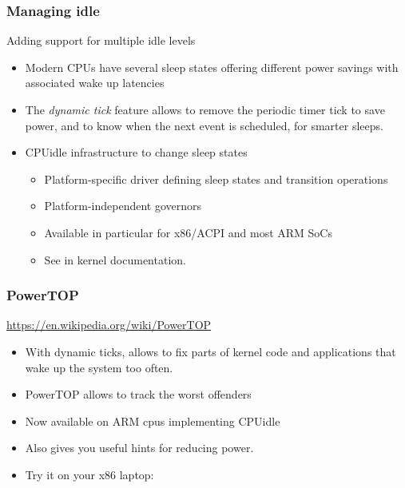 \begin{frame}
  \frametitle{Managing idle}
  Adding support for multiple idle levels
  \begin{itemize}
  \item Modern CPUs have several sleep states offering different
    power savings with associated wake up latencies
  \item The {\em dynamic tick} feature allows to remove the
    periodic timer tick to save power, and to know when the next event is
    scheduled, for smarter sleeps.
  \item CPUidle infrastructure to change sleep states
    \begin{itemize}
    \item Platform-specific driver defining sleep states and
      transition operations
    \item Platform-independent governors
    \item Available in particular for x86/ACPI and most ARM SoCs
    \item See  in kernel documentation.
    \end{itemize}
  \end{itemize}
\end{frame}

\begin{frame}
  \frametitle{PowerTOP}
  \url{https://en.wikipedia.org/wiki/PowerTOP}
  \begin{itemize}
  \item With dynamic ticks, allows to fix parts of kernel code and
    applications that wake up the system too often.
  \item PowerTOP allows to track the worst offenders
  \item Now available on ARM cpus implementing CPUidle
  \item Also gives you useful hints for reducing power.
  \item Try it on your x86 laptop:\\
  \end{itemize}
\end{frame}

